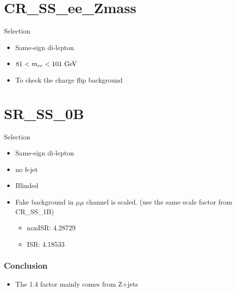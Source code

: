 \documentclass[mathserif,serif]{beamer}
\begin{document}



\section{CR\_SS\_ee\_Zmass}
\begin{frame}
\sectionpage
\end{frame}

\begin{frame}{Selection}
\begin{itemize}
\item Same-sign di-lepton
\item $81<m_{ee}<101\GeV$
\item To check the charge flip background
\end{itemize}
\end{frame}




\section{SR\_SS\_0B}
\begin{frame}
\sectionpage
\end{frame}

\begin{frame}{Selection}
\begin{itemize}
\item Same-sign di-lepton
\item no $b$-jet
\item Blinded
\item Fake background in $\mu\mu$ channel is scaled. (use the same scale factor from CR\_SS\_1B)
\begin{itemize}
\item nonISR: 4.28729
\item ISR: 4.18533
\end{itemize}
\end{itemize}
\end{frame}




%

\begin{frame}
\frametitle{Conclusion}
\begin{itemize}
\item The 1.4 factor mainly comes from Z+jets
\end{itemize}
\end{frame}
\end{document}
